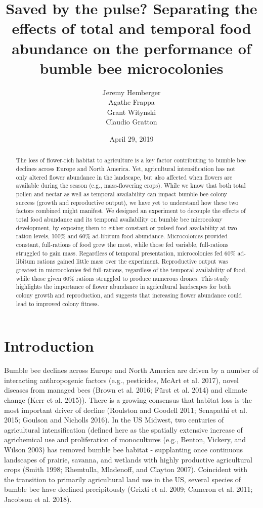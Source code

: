\documentclass[11pt,]{article}
\title{Saved by the pulse? Separating the effects of total and temporal food
abundance on the performance of bumble bee microcolonies}
\author{Jeremy Hemberger \\ Agathe Frappa \\ Grant Witynski \\ Claudio Gratton}
\date{April 29, 2019}
\begin{document}
\maketitle
\begin{abstract}
The loss of flower-rich habitat to agriculture is a key factor
contributing to bumble bee declines across Europe and North America.
Yet, agricultural intensification has not only altered flower abundance
in the landscape, but also affected when flowers are available during
the season (e.g., mass-flowering crops). While we know that both total
pollen and nectar as well as temporal availability can impact bumble bee
colony success (growth and reproductive output), we have yet to
understand how these two factors combined might manifest. We designed an
experiment to decouple the effects of total food abundance and its
temporal availability on bumble bee microcolony development, by exposing
them to either constant or pulsed food availability at two ration
levels, 100\% and 60\% ad-libitum food abundance. Microcolonies provided
constant, full-rations of food grew the most, while those fed variable,
full-rations struggled to gain mass. Regardless of temporal
presentation, microcolonies fed 60\% ad-libitum rations gained little
mass over the experiment. Reproductive output was greatest in
microcolonies fed full-rations, regardless of the temporal availability
of food, while those given 60\% rations struggled to produce numerous
drones. This study highlights the importance of flower abundance in
agricultural landscapes for both colony growth and reproduction, and
suggests that increasing flower abundance could lead to improved colony
fitness.
\end{abstract}

\hypertarget{introduction}{%
\section{Introduction}\label{introduction}}

Bumble bee declines across Europe and North America are driven by a
number of interacting anthropogenic factors (e.g., pesticides, McArt et
al. 2017), novel diseases from managed bees (Brown et al. 2016; Fürst et
al. 2014) and climate change (Kerr et al. 2015)). There is a growing
consensus that habitat loss is the most important driver of decline
(Roulston and Goodell 2011; Senapathi et al. 2015; Goulson and Nicholls
2016). In the US Midwest, two centuries of agricultural intensification
(defined here as the spatially extensive increase of agrichemical use
and proliferation of monocultures (e.g., Benton, Vickery, and Wilson
2003) has removed bumble bee habitat - supplanting once continuous
landscapes of prairie, savanna, and wetlands with highly productive
agricultural crops (Smith 1998; Rhemtulla, Mladenoff, and Clayton 2007).
Coincident with the transition to primarily agricultural land use in the
US, several species of bumble bee have declined precipitously (Grixti et
al. 2009; Cameron et al. 2011; Jacobson et al. 2018).
\end{document}

